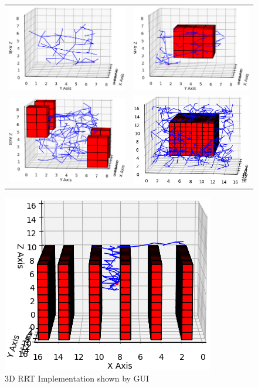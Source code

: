 

\begin{figure}[H]
\begin{center}
    \begin{tabular}{c  c}
    \includegraphics[width=0.45\linewidth]{chapters/chapter2/img/rrt_3d_1.png} & \includegraphics[width=0.45\linewidth]{chapters/chapter2/img/rrt_3d_2.png} \\
    \includegraphics[width=0.45\linewidth]{chapters/chapter2/img/rrt_3d_3.png} & \includegraphics[width=0.45\linewidth]{chapters/chapter2/img/rrt_3d_4.png}
    \end{tabular}
    \includegraphics[width=0.45\linewidth]{chapters/chapter2/img/rrt_3d_5.png}
    \caption{3D RRT Implementation shown by \gls{GUI}}
    \label{figure:3DrrtGui}
\end{center}
\end{figure}